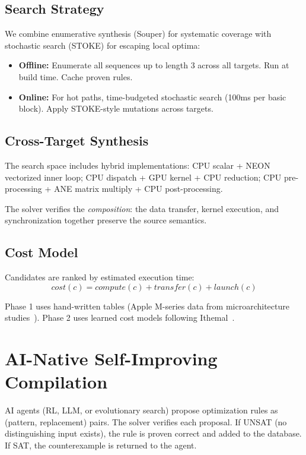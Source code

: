 \documentclass[11pt,twocolumn]{article}
\begin{document}
\subsection{Search Strategy}

We combine enumerative synthesis (Souper) for systematic coverage with stochastic search (STOKE) for escaping local optima:

\begin{itemize}[leftmargin=*,topsep=4pt,itemsep=2pt]
\item \textbf{Offline:} Enumerate all sequences up to length 3 across all targets. Run at build time. Cache proven rules.
\item \textbf{Online:} For hot paths, time-budgeted stochastic search (100ms per basic block). Apply STOKE-style mutations across targets.
\end{itemize}

\subsection{Cross-Target Synthesis}

The search space includes hybrid implementations: CPU scalar + NEON vectorized inner loop; CPU dispatch + GPU kernel + CPU reduction; CPU pre-processing + ANE matrix multiply + CPU post-processing.

The solver verifies the \emph{composition}: the data transfer, kernel execution, and synchronization together preserve the source semantics.

\subsection{Cost Model}

Candidates are ranked by estimated execution time:
\[
\mathit{cost}(c) = \mathit{compute}(c) + \mathit{transfer}(c) + \mathit{launch}(c)
\]

Phase 1 uses hand-written tables (Apple M-series data from microarchitecture studies~\cite{m1}). Phase 2 uses learned cost models following Ithemal~\cite{ithemal}.

\section{AI-Native Self-Improving Compilation}
\label{sec:ai}

AI agents (RL, LLM, or evolutionary search) propose optimization rules as (pattern, replacement) pairs. The solver verifies each proposal. If UNSAT (no distinguishing input exists), the rule is proven correct and added to the database. If SAT, the counterexample is returned to the agent.
\end{document}
